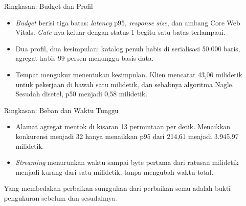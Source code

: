 \documentclass[aspectratio=169, table, 12pt]{beamer}
\begin{document}
\begin{frame}{{\Large Ringkasan: Budget dan Profil}}
  \vspace{10pt}
  \begin{itemize}
    \item \textit{Budget} berisi tiga batas: \textit{latency} p95, \textit{response size}, dan ambang
          Core Web Vitals. \textit{Gate}-nya keluar dengan status 1 begitu satu
          batas terlampaui.
    \item Dua profil, dua kesimpulan: katalog penuh habis di serialisasi
          50.000 baris, agregat habis 99 persen menunggu basis data.
    \item Tempat mengukur menentukan kesimpulan. Klien mencatat 43,06
          milidetik untuk pekerjaan di bawah satu milidetik, dan sebabnya
          algoritma Nagle. Sesudah disetel, p50 menjadi 0,58 milidetik.
  \end{itemize}
\end{frame}

\begin{frame}{{\Large Ringkasan: Beban dan Waktu Tunggu}}
  \vspace{10pt}
  \begin{itemize}
    \item Alamat agregat mentok di kisaran 13 permintaan per detik. Menaikkan
          konkurensi menjadi 32 hanya menaikkan p95 dari 214,61 menjadi
          3.945,97 milidetik.
    \item \textit{Streaming} menurunkan waktu sampai byte pertama dari
          ratusan milidetik menjadi kurang dari satu milidetik, tanpa
          mengubah waktu total.
  \end{itemize}
  \vspace{10pt}
  {\footnotesize Yang membedakan perbaikan sungguhan dari perbaikan semu
  adalah bukti pengukuran sebelum dan sesudahnya.}
\end{frame}
\end{document}
